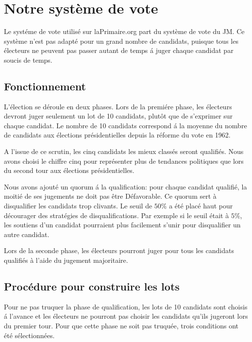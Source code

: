 \documentclass[conference]{IEEEtran}
\begin{document}




\section{Notre syst\`eme de vote}
\label{sec:laprimaire}

Le syst\'eme de vote utilis\'e sur laPrimaire.org part du syst\`eme de vote du JM. Ce syst\`eme n'est pas adapt\'e pour un grand nombre de candidats, puisque tous les \'electeurs ne peuvent pas passer autant de temps \'a juger chaque candidat par soucis de temps.

\subsection{Fonctionnement}
L'\'election se d\'eroule en deux phases. Lors de la premi\'ere phase, les \'electeurs devront juger seulement un lot de 10 candidats, plut\^ot que de s'exprimer sur chaque candidat. Le nombre de 10 candidats correspond \'a la moyenne du nombre de candidats aux \'elections pr\'esidentielles depuis la r\'eforme du vote en 1962.

A l'issue de ce scrutin, les cinq candidats les mieux class\'es seront qualifi\'es. Nous avons choisi le chiffre cinq pour repr\'esenter plus de tendances politiques que lors du second tour aux \'elections pr\'esidentielles. 

Nous avons ajout\'e un quorum \'a la qualification: pour chaque candidat qualifi\'e, la moiti\'e de ses jugements ne doit pas \^etre D\'efavorable. Ce quorum sert \`a disqualifier les candidats trop clivants. Le seuil de $50\%$ a \'et\'e plac\'e haut pour d\'ecourager des strat\'egies de disqualifications. Par exemple si le seuil \'etait \`a $5\%$, les soutiens d'un candidat pourraient plus facilement s'unir pour disqualifier un autre candidat.

Lors de la seconde phase, les \'electeurs pourront juger pour tous les candidats qualifi\'es \`a l'aide du jugement majoritaire.


\subsection{Proc\'edure pour construire les lots}

Pour ne pas truquer la phase de qualification, les lots de 10 candidats sont choisis \'a l'avance et les \'electeurs ne pourront pas choisir les candidats qu'ils jugeront lors du premier tour. Pour que cette phase ne soit pas truqu\'ee, trois conditions ont \'et\'e s\'electionn\'ees.
\end{document}
